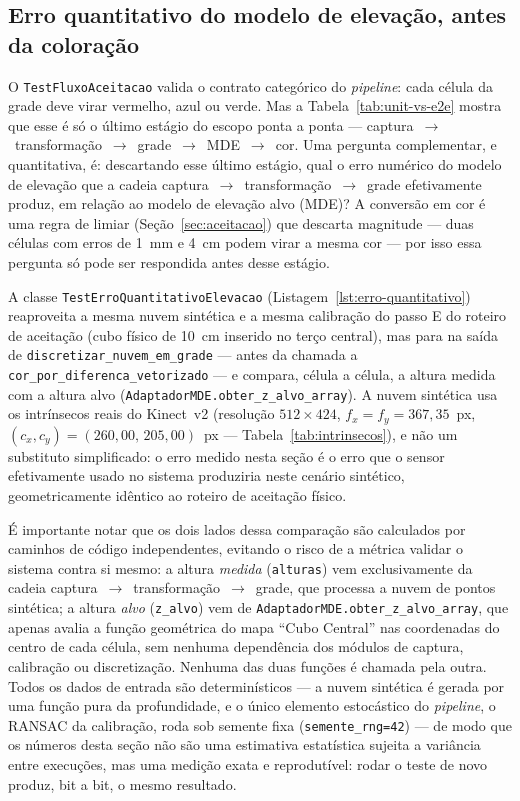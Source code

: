 \subsection{Erro quantitativo do modelo de elevação, antes da coloração}
\label{subsec:erro-quantitativo-mde}

O \texttt{TestFluxoAceitacao} valida o contrato categórico do
\textit{pipeline}: cada célula da grade deve virar vermelho, azul ou
verde. Mas a Tabela~\ref{tab:unit-vs-e2e} mostra que esse é só o
último estágio do escopo ponta a ponta —
captura~$\to$~transformação~$\to$~grade~$\to$~MDE~$\to$~cor.
Uma pergunta complementar, e quantitativa, é: descartando esse último
estágio, qual o erro numérico do modelo de elevação que a cadeia
captura~$\to$~transformação~$\to$~grade efetivamente produz, em
relação ao modelo de elevação alvo (MDE)? A conversão em cor é uma
regra de limiar (Seção~\ref{sec:aceitacao}) que descarta magnitude —
duas células com erros de 1~mm e 4~cm podem virar a mesma cor — por
isso essa pergunta só pode ser respondida antes desse estágio.

A classe \texttt{TestErroQuantitativoElevacao}
(Listagem~\ref{lst:erro-quantitativo}) reaproveita a mesma nuvem
sintética e a mesma calibração do passo E do roteiro de aceitação
(cubo físico de 10~cm inserido no terço central), mas para na saída de
\texttt{discretizar\_nuvem\_em\_grade} — antes da chamada a
\texttt{cor\_por\_diferenca\_vetorizado} — e compara, célula a célula,
a altura medida com a altura alvo
(\texttt{AdaptadorMDE.obter\_z\_alvo\_array}). A nuvem sintética usa os
intrínsecos reais do Kinect~v2 (resolução $512 \times 424$,
$f_x = f_y = 367{,}35$~px, $(c_x, c_y) = (260{,}00,\, 205{,}00)$~px —
Tabela~\ref{tab:intrinsecos}), e não um substituto simplificado: o
erro medido nesta seção é o erro que o sensor efetivamente usado no
sistema produziria neste cenário sintético, geometricamente idêntico
ao roteiro de aceitação físico.

É importante notar que os dois lados dessa comparação são calculados
por caminhos de código independentes, evitando o risco de a métrica
validar o sistema contra si mesmo: a altura \emph{medida}
(\texttt{alturas}) vem exclusivamente da cadeia
captura~$\to$~transformação~$\to$~grade, que processa a nuvem de
pontos sintética; a altura \emph{alvo} (\texttt{z\_alvo}) vem de
\texttt{AdaptadorMDE.obter\_z\_alvo\_array}, que apenas avalia a
função geométrica do mapa ``Cubo Central'' nas coordenadas do centro de
cada célula, sem nenhuma dependência dos módulos de captura,
calibração ou discretização. Nenhuma das duas funções é chamada pela
outra. Todos os dados de entrada são determinísticos — a nuvem
sintética é gerada por uma função pura da profundidade, e o único
elemento estocástico do \textit{pipeline}, o RANSAC da calibração,
roda sob semente fixa (\texttt{semente\_rng=42}) — de modo que os
números desta seção não são uma estimativa estatística sujeita a
variância entre execuções, mas uma medição exata e reprodutível: rodar
o teste de novo produz, bit a bit, o mesmo resultado.

